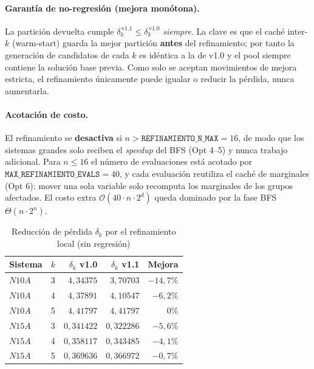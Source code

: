 \documentclass[12pt,letterpaper]{article}
\theoremstyle{definition}
\theoremstyle{remark}
\newcommand{\BigO}[1]{\mathcal{O}(#1)}
\newcommand{\BigTheta}[1]{\Theta(#1)}
\begin{document}
\paragraph{Garantía de no-regresión (mejora monótona).}
La partición devuelta cumple $\delta_k^{\,\mathrm{v1.1}} \leq \delta_k^{\,\mathrm{v1.0}}$
\emph{siempre}. La clave es que el caché inter-$k$ (warm-start) guarda la mejor partición
\textbf{antes} del refinamiento; por tanto la generación de candidatos de cada $k$ es
idéntica a la de v1.0 y el pool siempre contiene la solución base previa. Como solo se
aceptan movimientos de mejora estricta, el refinamiento únicamente puede igualar o reducir
la pérdida, nunca aumentarla.

\paragraph{Acotación de costo.}
El refinamiento se \textbf{desactiva} si $n > \texttt{REFINAMIENTO\_N\_MAX} = 16$, de modo
que los sistemas grandes solo reciben el \emph{speedup} del BFS (Opt 4--5) y nunca trabajo
adicional. Para $n \leq 16$ el número de evaluaciones está acotado por
$\texttt{MAX\_REFINAMIENTO\_EVALS} = 40$, y cada evaluación reutiliza el caché de marginales
(Opt 6): mover una sola variable solo recomputa los marginales de los grupos afectados.
El costo extra $\BigO{40 \cdot n \cdot 2^d}$ queda dominado por la fase BFS $\BigTheta{n \cdot 2^n}$.

\begin{table}[ht]
\centering
\caption{Reducción de pérdida $\delta_k$ por el refinamiento local (sin regresión)}
\label{tab:opt7-perdida}
\begin{tabular}{@{}l c r r r@{}}
\toprule
\textbf{Sistema} & \textbf{$k$} & \textbf{$\delta_k$ v1.0} & \textbf{$\delta_k$ v1.1} & \textbf{Mejora} \\
\midrule
$N10A$ & 3 & $4{,}34375$ & $3{,}70703$ & $-14{,}7\%$ \\
$N10A$ & 4 & $4{,}37891$ & $4{,}10547$ & $-6{,}2\%$ \\
$N10A$ & 5 & $4{,}41797$ & $4{,}41797$ & $0\%$ \\
$N15A$ & 3 & $0{,}341422$ & $0{,}322286$ & $-5{,}6\%$ \\
$N15A$ & 4 & $0{,}358117$ & $0{,}343485$ & $-4{,}1\%$ \\
$N15A$ & 5 & $0{,}369636$ & $0{,}366972$ & $-0{,}7\%$ \\
\bottomrule
\end{tabular}
\end{table}
\end{document}
